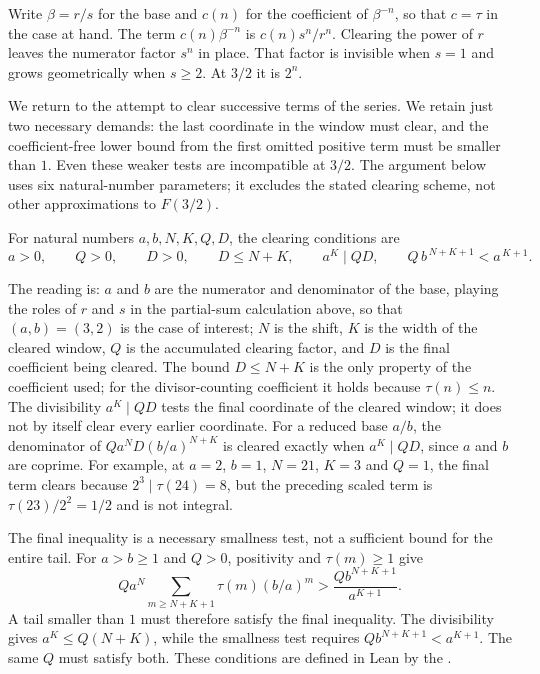 Write $\beta=r/s$ for the base and $c(n)$ for the coefficient of $\beta^{-n}$,
so that $c=\tau$ in the case at hand.  The term $c(n)\beta^{-n}$ is
$c(n)s^{n}/r^{n}$.  Clearing the
power of $r$ leaves the numerator factor $s^{n}$ in place.  That factor is
invisible when $s=1$ and grows geometrically when $s\ge2$.  At $3/2$ it is
$2^{n}$.


We return to the attempt to clear successive terms of the series.
We retain just two necessary demands: the last coordinate in the
window must clear, and the coefficient-free lower bound from the
first omitted positive term must be smaller than $1$. Even these
weaker tests are incompatible at
$3/2$. The argument below uses six natural-number parameters;
it excludes the stated clearing scheme, not other approximations
to $F(3/2)$.

\begin{definition}\label{long1049:def:corridor}
For natural numbers $a,b,N,K,Q,D$, the clearing conditions are
\[
 a>0,\qquad Q>0,\qquad D>0,\qquad D\le N+K,\qquad
 a^{K}\mid QD,\qquad Q\,b^{\,N+K+1}<a^{\,K+1}.
\]
\end{definition}

\noindent The reading is: $a$ and $b$ are the numerator and denominator of the
base, playing the roles of $r$ and $s$ in the partial-sum calculation
above, so that
$(a,b)=(3,2)$ is the case of interest;
$N$ is the shift, $K$ is the width of the cleared window, $Q$ is the
accumulated clearing factor, and $D$ is the final coefficient being cleared.
The bound $D\le N+K$ is the only property of the coefficient used; for the
divisor-counting coefficient it holds because $\tau(n)\le n$.  The divisibility $a^{K}\mid QD$ tests the final coordinate of the cleared
window; it does not by itself clear every earlier coordinate. For a
reduced base $a/b$, the denominator of
$Qa^N D(b/a)^{N+K}$ is cleared exactly when $a^K\mid QD$, since
$a$ and $b$ are coprime. For example, at $a=2$, $b=1$,
$N=21$, $K=3$ and $Q=1$, the final term clears because
$2^3\mid\tau(24)=8$, but the preceding scaled term is
$\tau(23)/2^2=1/2$ and is not integral.

The final inequality is a necessary smallness test, not a sufficient
bound for the entire tail. For $a>b\ge1$ and $Q>0$, positivity and
$\tau(m)\ge1$ give
\[
 Q a^N\sum_{m\ge N+K+1}\tau(m)(b/a)^m
 >\frac{Qb^{N+K+1}}{a^{K+1}}.
\]
A tail smaller than $1$ must therefore satisfy the final inequality.
The divisibility gives $a^K\le Q(N+K)$, while the smallness test requires
$Qb^{N+K+1}<a^{K+1}$. The same $Q$ must satisfy both. These
conditions are defined in Lean by the
.

